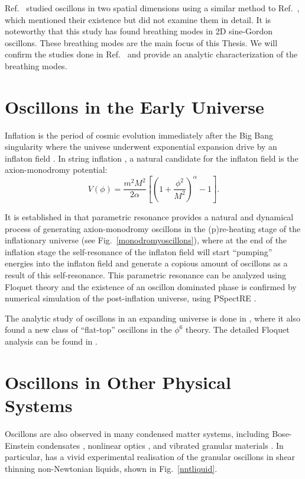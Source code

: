 \documentclass[11pt]{book}
\begin{document}
Ref.~\cite{Hindmarsh:2006ur} studied oscillons in two spatial dimensions using a similar method to Ref.~\cite{Salmi:2012ta}, which mentioned their existence but did not examine them in detail. It is noteworthy that this study has found breathing modes in 2D sine-Gordon oscillons. These breathing modes are the main focus of this Thesis. We will confirm the studies done in Ref.~\cite{Hindmarsh:2006ur} and provide an analytic characterization of the breathing modes.

\section{Oscillons in the Early Universe}\label{litrev:cosmo}
Inflation is the period of cosmic evolution immediately after the Big Bang singularity where the univese underwent exponential expansion drive by an inflaton field \cite{mukhanov2005physical}. In string inflation \cite{stringInflationBook, McAllister:2008hb, Silverstein:2008sg, Flauger:2009ab}, a natural candidate for the inflaton field is the axion-monodromy potential:
\begin{equation}\label{fullampot}
  V(\phi) = \frac{m^2M^2}{2\alpha} \left[\left(1+\frac{\phi^2}{M^2}\right)^\alpha -1\right].
\end{equation}

It is established in \cite{Amin:2010dc, Amin:2011hj} that parametric resonance provides a natural and dynamical process of generating axion-monodromy oscillons in the (p)re-heating stage of the inflationary universe (see Fig.~\ref{monodromyoscillons}), where at the end of the inflation stage the self-resonance of the inflaton field will start ``pumping'' energies into the inflaton field and generate a copious amount of oscillons as a result of this self-resonance. This parametric resonance can be analyzed using Floquet theory and the existence of an oscillon dominated phase is confirmed by numerical simulation of the post-inflation universe, using PSpectRE \cite{Easther:2010qz}.

The analytic study of oscillons in an expanding universe is done in \cite{Amin:2010jq}, where it also found a new class of ``flat-top'' oscillons in the $\phi^6$ theory. The detailed Floquet analysis can be found in \cite{Amin:2010dc}.

\section{Oscillons in Other Physical Systems}\label{litrev:phymisc}
Oscillons are also observed in many condensed matter systems, including Bose-Einstein condensates \cite{umbanhowar1996localized}, nonlinear optics \cite{Copeland:2014qra}, and vibrated granular materials \cite{Tsimring:1997zz, PhysRevLett.83.3190}. In particular, \cite{PhysRevLett.83.3190} has a vivid experimental realisation of the granular oscillons in shear thinning non-Newtonian liquids, shown in Fig.~\ref{nntliquid}.
\end{document}
